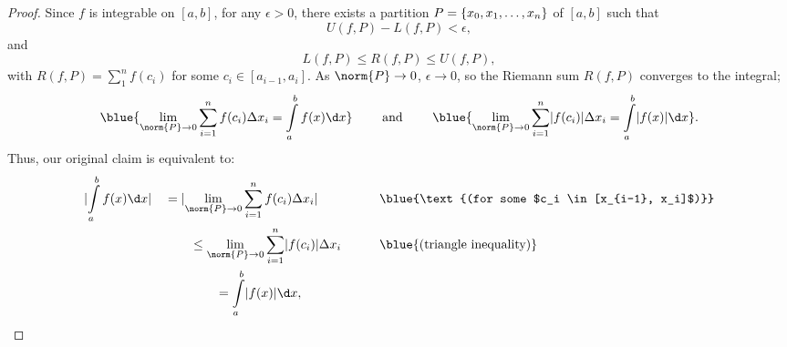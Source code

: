 \begin{answer}
\begin{claim}
    \begin{proof}
      Since $f$ is integrable on $[a, b]$, for any $\epsilon > 0$,
      there exists a partition $P = \left\{x_0, x_1, \ldots, x_n\right\}$ of $[a, b]$
      such that
      \[ U(f, P) - L(f, P) < \epsilon, \]
      and \[ L(f, P) \leq R(f, P) \leq U(f, P), \]
      with $\displaystyle R(f, P) = \sum\limits_1^n f(c_i)$ for some
      $c_i \in [a_{i-1}, a_i]$.
      As $\norm{P} \to 0$, $\epsilon \to 0$, so the Riemann sum $R(f, P)$
      converges to the integral;
      \[
        \blue{
          \lim_{\norm{P} \to 0} \sum_{i=1}^n f(c_i) \Delta x_i =
          \int\limits_a^b f(x) \d x}
        \qquad \text{ and } \qquad
        \blue{
          \lim_{\norm{P} \to 0} \sum_{i=1}^n \abs{f(c_i)} \Delta x_i =
          \int\limits_a^b \abs{f(x)} \d x}.
      \]
      Thus, our original claim is equivalent to:
      \begin{alignat*}{5}
        &\abs{\int\limits_a^b f(x) \d x} &&= \abs{\lim_{\norm{P} \to 0}
          \sum_{i=1}^n f(c_i) \Delta x_i}
          &&\qquad \blue{\text{(for some $c_i \in [x_{i-1}, x_i]$)}}\\
        & &&\qquad \leq \lim_{\norm{P} \to 0} \sum_{i=1}^n \abs{f(c_i)} \Delta x_i
          &&\qquad \blue{\text{(triangle inequality)}} \\
        & &&\qquad \qquad= \int\limits_a^b \abs{f(x)} \d x,
      \end{alignat*}
    \end{proof}
  \end{claim}
  \vspace{-3em}
\end{answer}

